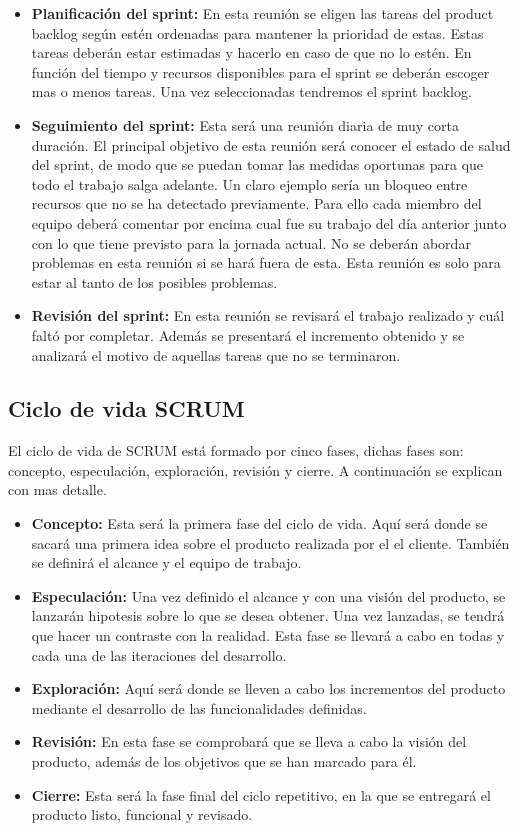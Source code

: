 \begin{itemize}
  \item \textbf{Planificación del sprint:} En esta reunión se eligen las tareas del product
     backlog según estén ordenadas para mantener la prioridad de estas. Estas tareas deberán
     estar estimadas y hacerlo en caso de que no lo estén. En función del tiempo y recursos
     disponibles para el sprint se deberán escoger mas o menos tareas. Una vez seleccionadas
     tendremos el sprint backlog.
  \item \textbf{Seguimiento del sprint:} Esta será una reunión diaria de muy corta duración.
     El principal objetivo de esta reunión será conocer el estado de salud del sprint, de modo
     que se puedan tomar las medidas oportunas para que todo el trabajo salga adelante. Un
     claro ejemplo sería un bloqueo entre recursos que no se ha detectado previamente. Para
     ello cada miembro del equipo deberá comentar por encima cual fue su trabajo del día
     anterior junto con lo que tiene previsto para la jornada actual. No se deberán abordar
     problemas en esta reunión si se hará fuera de esta. Esta reunión es solo para estar al
     tanto de los posibles problemas.
  \item \textbf{Revisión del sprint:} En esta reunión se revisará el trabajo realizado y cuál
     faltó por completar. Además se presentará el incremento obtenido y se analizará el motivo
     de aquellas tareas que no se terminaron.
\end{itemize}


\subsection{Ciclo de vida SCRUM}

El ciclo de vida de SCRUM está formado por cinco fases, dichas fases son: concepto, especulación,
 exploración, revisión y cierre. A continuación se explican con mas detalle.

\begin{itemize}
  \item \textbf{Concepto:} Esta será la primera fase del ciclo de vida. Aquí será donde se sacará
     una primera idea sobre el producto realizada por el el cliente. También se definirá el alcance
     y el equipo de trabajo.
  \item \textbf{Especulación:} Una vez definido el alcance y con una visión del producto, se lanzarán
     hipotesis sobre lo que se desea obtener. Una vez lanzadas, se tendrá que hacer un contraste
     con la realidad. Esta fase se llevará a cabo en todas y cada una de las iteraciones del desarrollo.
  \item \textbf{Exploración:} Aquí será donde se lleven a cabo los incrementos del producto mediante
     el desarrollo de las funcionalidades definidas.
  \item \textbf{Revisión:} En esta fase se comprobará que se lleva a cabo la visión del producto, además
     de los objetivos que se han marcado para él.
  \item \textbf{Cierre:} Esta será la fase final del ciclo repetitivo, en la que se entregará
     el producto listo, funcional y revisado.
\end{itemize}

